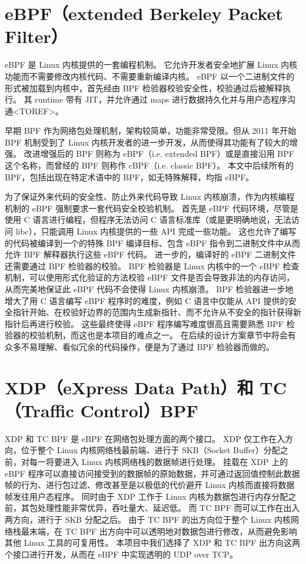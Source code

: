 \section{eBPF（extended Berkeley Packet Filter）}

eBPF 是 Linux 内核提供的一套编程机制。
它允许开发者安全地扩展 Linux 内核功能而不需要修改内核代码、不需要重新编译内核。
eBPF 以一个二进制文件的形式被加载到内核中，首先经由 BPF 检验器校验安全性，校验通过后被解释执行。
其 runtime 带有 JIT，并允许通过 maps 进行数据持久化并与用户态程序沟通<TOREF>。

早期 BPF 作为网络包处理机制，架构较简单，功能非常受限。但从 2011 年开始 BPF 机制受到了 Linux 内核开发者的进一步开发，从而使得其功能有了较大的增强。
改进增强后的 BPF 则称为 eBPF（i.e. extended BPF）或是直接沿用 BPF 这个名称，而曾经的 BPF 则称作 cBPF（i.e. classic BPF）。\cite{10.1145/3371038}
本文中后续所有的 BPF，包括出现在特定术语中的 BPF，如无特殊解释，均指 eBPF。

为了保证外来代码的安全性、防止外来代码导致 Linux 内核崩溃，作为内核编程机制的 eBPF 强制要求一套代码安全校验机制。
首先是 eBPF 代码环境，尽管是使用 C 语言进行编程，但程序无法访问 C 语言标准库（或是更明确地说，无法访问 libc），只能调用 Linux 内核提供的一些 API 完成一些功能。
这也允许了编写的代码被编译到一个的特殊 BPF 编译目标、包含 eBPF 指令到二进制文件中从而允许 BPF 解释器执行这些 eBPF 代码。
进一步的，编译好的 eBPF 二进制文件还需要通过 BPF 检验器的校验。
BPF 检验器是 Linux 内核中的一个 eBPF 检查机制，可以使用形式化验证的方法校验 eBPF 文件是否会导致非法的内存访问，从而完美地保证此 eBPF 代码不会使得 Linux 内核崩溃。
BPF 检验器进一步地增大了用 C 语言编写 eBPF 程序时的难度，例如 C 语言中仅能从 API 提供的安全指针开始、在校验好边界的范围内生成新指针、而不允许从不安全的指针获得新指针后再进行校验。
这些最终使得 eBPF 程序编写难度很高且需要熟悉 BPF 检验器的校验机制，而这也是本项目的难点之一。
在后续的设计方案章节中将会有众多不易理解、看似冗余的代码操作，便是为了通过 BPF 检验器而做的。

\section{XDP（eXpress Data Path）和 TC（Traffic Control）BPF}

XDP 和 TC BPF 是 eBPF 在网络包处理方面的两个接口。
XDP 仅工作在入方向，位于整个 Linux 内核网络栈最前端、进行于 SKB（Socket Buffer）分配之前，对每一将要进入 Linux 内核网络栈的数据帧进行处理。
挂载在 XDP 上的 eBPF 程序可以直接访问接受到的数据帧的原始数据，并可通过返回值控制此数据帧的行为、进行包过滤、修改甚至是以极低的代价避开 Linux 内核而直接将数据帧发往用户态程序。
同时由于 XDP 工作于 Linux 内核为数据包进行内存分配之前，其包处理性能非常优异，吞吐量大、延迟低。
而 TC BPF 而可以工作在出入两方向，进行于 SKB 分配之后。
由于 TC BPF 的出方向位于整个 Linux 内核网络栈最末端，在 TC BPF 出方向中可以透明地对数据包进行修改，从而避免影响其他 Linux 工具的可复用性。
本项目中我们选择了 XDP 和 TC BPF 出方向这两个接口进行开发，从而在 eBPF 中实现透明的 UDP over TCP。
